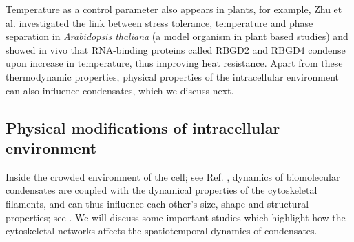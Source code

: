 
Temperature as a control parameter also appears in plants, for example, Zhu et al. \cite{Zhu2022} investigated the link between stress tolerance, temperature and phase separation in \textit{Arabidopsis thaliana} (a model organism in plant based studies) and showed in vivo that RNA-binding proteins called RBGD2 and RBGD4 condense upon increase in temperature, thus improving heat resistance.
Apart from these thermodynamic properties, physical properties of the intracellular environment can also influence condensates, which we discuss next. 

\subsection{Physical modifications of intracellular environment}

Inside the crowded environment of the cell; see Ref. \cite{Andre2020}, dynamics of biomolecular condensates are coupled with the dynamical properties of the cytoskeletal filaments, and can thus influence each other's size, shape and structural properties; see .
We will discuss some important studies which highlight how the cytoskeletal networks affects the spatiotemporal dynamics of condensates. 

